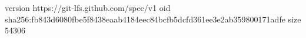 version https://git-lfs.github.com/spec/v1
oid sha256:fb843d6080fbe5f8438eaab4184eec84bcfb5dcfd361ee3e2ab359800171adfe
size 54306
